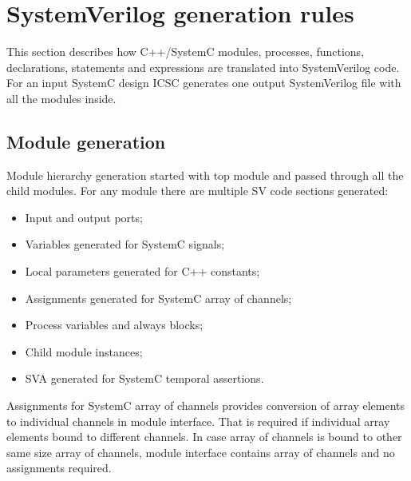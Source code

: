 \section{SystemVerilog generation rules}\label{section:trans_flow}

This section describes how C++/SystemC modules, processes, functions, declarations, statements and expressions are translated into SystemVerilog code.
For an input SystemC design ICSC generates one output SystemVerilog file with all the modules inside.


\subsection{Module generation}\label{section:module_gen}

Module hierarchy generation started with top module and passed through all the child modules. For any module there are multiple SV code sections generated:
\begin{itemize}
\item Input and output ports;
\item Variables generated for SystemC signals;
\item Local parameters generated for C++ constants;
\item Assignments generated for SystemC array of channels;
\item Process variables and always blocks;
\item Child module instances;
\item SVA generated for SystemC temporal assertions.
\end{itemize}

Assignments for SystemC array of channels provides conversion of array elements to individual channels in module interface. That is required if individual array elements bound to different channels. In case array of channels is bound to other same size array of channels, module interface contains array of channels and no assignments required. 


